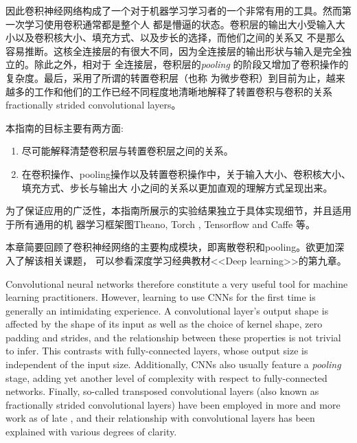 \documentclass[notitlepage]{report}
\begin{document}
因此卷积神经网络构成了一个对于机器学习学习者的一个非常有用的工具。然而第一次学习使用卷积通常都是整个人
都是懵逼的状态。卷积层的输出大小受输入大小以及卷积核大小、填充方式、以及步长的选择，而他们之间的关系又
不是那么容易推断。这核全连接层的有很大不同，因为全连接层的输出形状与输入是完全独立的。除此之外，相对于
全连接层，卷积层的{\em pooling \/}的阶段又增加了卷积操作的复杂度。最后，采用了所谓的转置卷积层（也称
为微步卷积）到目前为止，越来越多的工作和他们的工作已经不同程度地清晰地解释了转置卷积与卷积的关系fractionally 
strided convolutional layers\citep{zeiler2011adaptive,zeiler2014visualizing,
long2015fully,radford2015unsupervised,visin15,im2016generating}。

本指南的目标主要有两方面:
\begin{enumerate}
    \item 尽可能解释清楚卷积层与转置卷积层之间的关系。
    \item 在卷积操作、pooling操作以及转置卷积操作中，关于输入大小、卷积核大小、填充方式、步长与输出大
          小之间的关系以更加直观的理解方式呈现出来。
\end{enumerate}

为了保证应用的广泛性，本指南所展示的实验结果独立于具体实现细节，并且适用于所有通用的机
器学习框架图Theano\citep{bergstra2010theano,bastien2012theano},
Torch \citep{collobert2011torch7},
Tensorflow \citep{abaditensorflow} and Caffe \citep{jia2014caffe}等。

本章简要回顾了卷积神经网络的主要构成模块，即离散卷积和pooling。欲更加深入了解该相关课题，
可以参看深度学习经典教材<<Deep learning>>的第九章\citep{Goodfellow-et-al-2016-Book}。

Convolutional neural networks therefore constitute a very useful tool for
machine learning practitioners. However, learning to use CNNs for the first time
is generally an intimidating experience. A convolutional layer's output shape is
affected by the shape of its input as well as the choice of kernel shape, zero
padding and strides, and the relationship between these properties is not
trivial to infer. This contrasts with fully-connected layers, whose output size
is independent of the input size. Additionally, CNNs also usually feature a {\em
pooling\/} stage, adding yet another level of complexity with respect to
fully-connected networks.  Finally, so-called transposed convolutional layers
(also known as fractionally strided convolutional layers) have been employed in
more and more work as of late \citep{zeiler2011adaptive,zeiler2014visualizing,
long2015fully,radford2015unsupervised,visin15,im2016generating}, and their
relationship with convolutional layers has been explained with various degrees
of clarity.
\end{document}
